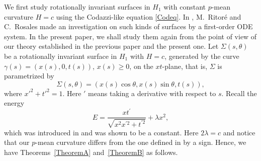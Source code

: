 \documentclass[10pt,a4paper]{amsart}
\numberwithin{equation}{section}
\begin{document}
We first study rotationally invariant surfaces in $H_1$ with constant $p$-mean curvature $H=c$ using the Codazzi-like equation \eqref{Codeq}. In \cite{Ritore/Rosales:2006}, M.~Ritor\'{e} and C.~Rosales made an investigation on such kinds of surfaces by a first-order ODE system. In the present paper, we shall study them again from the point of view of our theory established in the previous paper \cite{ChiuH/LiuH:2022} and the present one.
Let $\Sigma(s,\theta)$ be a rotationally invariant surface in $H_1$ with $H=c$, generated by the curve~${\gamma(s)=(x(s),0,t(s))}$, $x(s)\geq 0$, on the $xt$-plane,
that is, $\Sigma$ is parametrized by
\begin{equation*}
\Sigma(s,\theta)=(x(s)\cos \theta,x(s)\sin \theta,t(s)),
\end{equation*}
where $x'^{2}+t'^{2}=1$. Here $'$ means taking a derivative with respect to $s$. Recall the energy
\begin{equation}\label{energy1}
E=\frac{xt^{\prime }}{\sqrt{x^2x^{\prime 2}+t^{\prime 2}}}+\lambda x^2,
\end{equation}
which was introduced in \cite{Ritore/Rosales:2006} and was shown to be a constant. Here $2\lambda=c$ and notice that our $p$-mean curvature differs from the one defined in \cite{Ritore/Rosales:2006} by a sign. Hence, we have Theorems~\ref{TheoremA} and~\ref{TheoremB} as follows.
\end{document}
